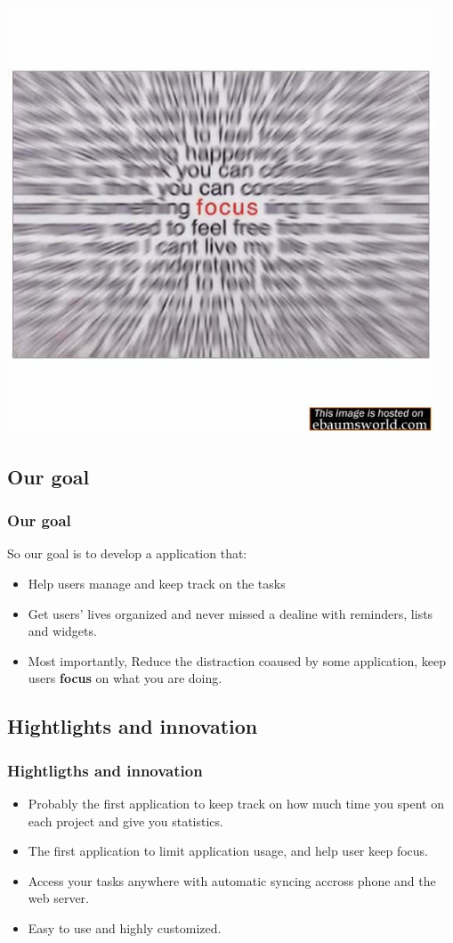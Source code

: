 \documentclass{beamer}
\begin{document}
\begin{frame}
 \includegraphics[width=0.95\textwidth]{focus}
\end{frame}

\subsection{Our goal}
\begin{frame}\frametitle{Our goal}
So our goal is to develop a application that:
\begin{itemize}
\item Help users manage and keep track on the tasks
\pause
\item Get users' lives organized and never missed a dealine with reminders, lists
and widgets. 
\pause
\item Most importantly, Reduce the distraction coaused by some application, keep
users \textbf{focus} on what you are doing.
\end{itemize}
\end{frame}
\subsection{Hightlights and innovation}
\begin{frame}\frametitle{Hightligths and innovation}
\begin{itemize}
\item Probably the first application to keep track on how much time you spent on
each project and give you statistics. 
\pause
\item The first application to limit application usage, and help user keep
focus.
\pause
\item  Access your tasks anywhere with automatic syncing accross phone and the
web server.
\pause
\item Easy to use and highly customized.
\end{itemize}

\end{frame}
\end{document}

